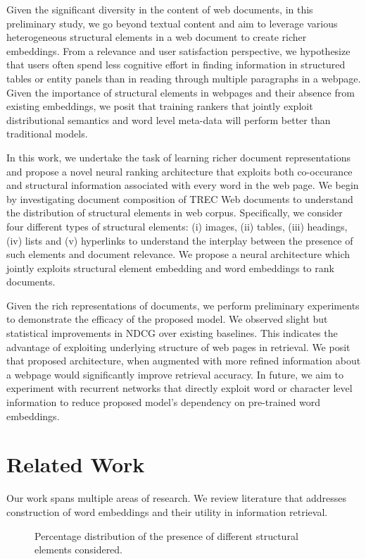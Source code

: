 \documentclass[runningheads,a4paper]{llncs}
\begin{document}
Given the significant diversity in the content of web documents, 
in this preliminary study, we go beyond textual content and aim to leverage 
various heterogeneous structural elements in a web document to create richer embeddings. 
From a relevance and user satisfaction perspective, we hypothesize that users 
often spend less cognitive effort in finding information in structured 
tables or entity panels than in reading through multiple paragraphs in a webpage. 
Given the importance of structural elements in webpages and their absence from 
existing embeddings, we posit that training rankers that jointly exploit 
distributional semantics and word level meta-data will perform better than 
traditional models. 

In this work, we undertake the task of learning richer document representations 
and propose a novel neural ranking architecture that exploits both co-occurance and 
structural information associated with every word in the web page. 
We begin by investigating document composition of TREC Web documents to 
understand the distribution of structural elements in web corpus. Specifically, we consider four different 
types of structural elements: (i) images, (ii) tables, (iii) headings, (iv) lists and (v) hyperlinks to 
understand the interplay between the presence of such elements and document relevance. 
We propose a neural architecture which jointly exploits structural element embedding and 
word embeddings to rank documents.

Given the rich representations of documents, we perform preliminary experiments to 
demonstrate the efficacy of the proposed model. We observed 
slight but statistical improvements in NDCG over existing baselines. This indicates the 
advantage of exploiting underlying structure of web pages in retrieval. We posit that proposed 
architecture, when augmented with more refined information about a webpage would significantly 
improve retrieval accuracy. In future, we aim to experiment with recurrent networks that directly 
exploit word or character level information to reduce proposed model's dependency on 
pre-trained word embeddings.





\section{Related Work}
\label{sec:related_work}
Our work spans multiple areas of research. We review literature that addresses 
construction of word embeddings and their utility in information retrieval.
\begin{figure}[t]
        \centering
        \caption{Percentage distribution of the presence of different structural 
elements considered.}
        \label{fig:elements}
\end{figure}
\end{document}
